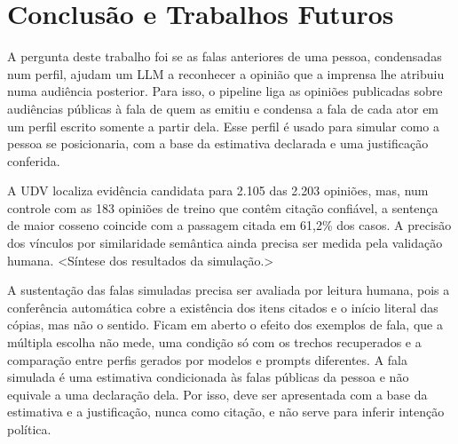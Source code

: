 \section{Conclus\~ao e Trabalhos Futuros}
\label{sec:conclusao}

A pergunta deste trabalho foi se as falas anteriores de uma pessoa, condensadas num perfil, ajudam
um LLM a reconhecer a opinião que a imprensa lhe atribuiu numa audiência posterior. Para isso, o
pipeline liga as opiniões publicadas sobre audiências públicas à fala de quem as emitiu e condensa a
fala de cada ator em um perfil escrito somente a partir dela. Esse perfil é usado para simular como a
pessoa se posicionaria, com a base da estimativa declarada e uma justificação conferida.

A UDV localiza evidência candidata para 2.105 das 2.203 opiniões, mas, num controle com as 183
opiniões de treino que contêm citação confiável, a sentença de maior cosseno coincide com a passagem
citada em 61,2\% dos casos. A precisão dos vínculos por similaridade semântica ainda precisa ser
medida pela validação humana. <Síntese dos resultados da simulação.>

A sustentação das falas simuladas precisa ser avaliada por leitura humana, pois a conferência
automática cobre a existência dos itens citados e o início literal das cópias, mas não o sentido.
Ficam em aberto o efeito dos exemplos de fala, que a múltipla escolha não mede, uma condição só com
os trechos recuperados e a comparação entre perfis gerados por modelos e prompts diferentes. A fala
simulada é uma estimativa condicionada às falas públicas da pessoa e não equivale a uma declaração
dela. Por isso, deve ser apresentada com a base da estimativa e a justificação, nunca como citação, e
não serve para inferir intenção política.
